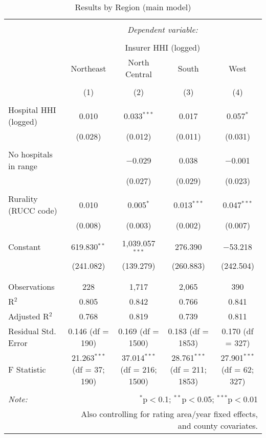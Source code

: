 
\begin{table}[!htbp] \centering 
  \caption{Results by Region (main model)} 
  \label{} 
\scriptsize 
\begin{tabular}{@{\extracolsep{5pt}}lcccc} 
\\[-1.8ex]\hline 
\hline \\[-1.8ex] 
 & \multicolumn{4}{c}{\textit{Dependent variable:}} \\ 
\cline{2-5} 
\\[-1.8ex] & \multicolumn{4}{c}{Insurer HHI (logged)} \\ 
 & Northeast & North Central & South & West \\ 
\\[-1.8ex] & (1) & (2) & (3) & (4)\\ 
\hline \\[-1.8ex] 
 Hospital HHI (logged) & 0.010 & 0.033$^{***}$ & 0.017 & 0.057$^{*}$ \\ 
  & (0.028) & (0.012) & (0.011) & (0.031) \\ 
  & & & & \\ 
 No hospitals in range &  & $-$0.029 & 0.038 & $-$0.001 \\ 
  &  & (0.027) & (0.029) & (0.023) \\ 
  & & & & \\ 
 Rurality (RUCC code) & 0.010 & 0.005$^{*}$ & 0.013$^{***}$ & 0.047$^{***}$ \\ 
  & (0.008) & (0.003) & (0.002) & (0.007) \\ 
  & & & & \\ 
 Constant & 619.830$^{**}$ & 1,039.057$^{***}$ & 276.390 & $-$53.218 \\ 
  & (241.082) & (139.279) & (260.883) & (242.504) \\ 
  & & & & \\ 
\hline \\[-1.8ex] 
Observations & 228 & 1,717 & 2,065 & 390 \\ 
R$^{2}$ & 0.805 & 0.842 & 0.766 & 0.841 \\ 
Adjusted R$^{2}$ & 0.768 & 0.819 & 0.739 & 0.811 \\ 
Residual Std. Error & 0.146 (df = 190) & 0.169 (df = 1500) & 0.183 (df = 1853) & 0.170 (df = 327) \\ 
F Statistic & 21.263$^{***}$ (df = 37; 190) & 37.014$^{***}$ (df = 216; 1500) & 28.761$^{***}$ (df = 211; 1853) & 27.901$^{***}$ (df = 62; 327) \\ 
\hline 
\hline \\[-1.8ex] 
\textit{Note:}  & \multicolumn{4}{r}{$^{*}$p$<$0.1; $^{**}$p$<$0.05; $^{***}$p$<$0.01} \\ 
 & \multicolumn{4}{r}{Also controlling for rating area/year fixed effects, and county covariates.} \\ 
\end{tabular} 
\end{table} 

